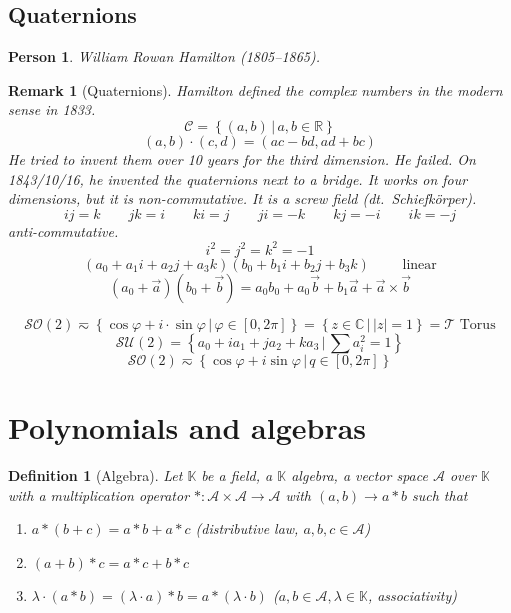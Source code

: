 \documentclass{article}
\newcounter{lecref}[section]
\numberwithin{lecref}{section}
\newtheorem{definition}[lecref]{Definition}
\newtheorem{remark}[lecref]{Remark}
\newtheorem*{person}{Person}
\newcommand{\setdef}[2]{\left\{\left.#1\,\right|\,#2\right\}}
\newcommand{\card}[1]{\left|#1\right|}
\begin{document}
\subsection{Quaternions}

\begin{person}
  William Rowan Hamilton (1805--1865).
\end{person}

\begin{remark}[Quaternions]
  Hamilton defined the complex numbers in the modern sense in 1833.
  \[ \mathcal C = \setdef{(a,b)}{a,b \in \mathbb R} \]
  \[ (a,b) \cdot (c, d) = (ac - bd, ad + bc) \]
  He tried to invent them over 10 years for the third dimension.
  He failed.
  On 1843/10/16, he invented the quaternions next to a bridge.
  It works on four dimensions, but it is non-commutative.
  It is a screw field (dt.~\foreignlanguage{german}{Schiefk\"orper}).
  \[ ij = k \qquad jk = i \qquad ki = j \qquad ji = -k \qquad kj = -i \qquad ik = -j \]
  anti-commutative.
  \[ i^2 = j^2 = k^2 = -1 \]
  \[ (a_0 + a_1 i + a_2 j + a_3 k) (b_0 + b_1 i + b_2 j + b_3 k) \qquad \text{ linear} \]
  \[ (a_0 + \vec a) (b_0 + \vec b) = a_0 b_0 + a_0 \vec b + b_1 \vec a + \vec a \times \vec b \]
\end{remark}

\[ \mathcal{SO}(2) \eqsim \setdef{\cos\varphi + i \cdot \sin\varphi}{\varphi \in [0,2\pi]} = \setdef{z \in \mathbb C}{\card{z} = 1} = \mathcal T \text{ Torus} \]
\[ \mathcal{SU}(2) = \setdef{a_0 + i a_1 + j a_2 + k a_3}{\sum a_i^2 = 1} \]
\[ \mathcal{SO}(2) \eqsim \setdef{\cos \varphi + i \sin\varphi}{q \in [0,2\pi]} \]

\section{Polynomials and algebras} %

\begin{definition}[Algebra] %
  Let $\mathbb K$ be a field, a $\mathbb K$ algebra, a vector space $\mathcal A$ over $\mathbb K$
  with a multiplication operator $*: \mathcal A \times \mathcal A \to \mathcal A$ with $(a,b) \to a * b$ such that
  \begin{enumerate}
    \item $a * (b + c) = a * b + a * c$ (distributive law, $a, b, c \in \mathcal A$)
    \item $(a + b) * c = a * c + b * c$
    \item $\lambda \cdot (a * b) = (\lambda \cdot a) * b = a * (\lambda \cdot b)$ ($a, b \in \mathcal A, \lambda \in \mathbb K$, associativity)
  \end{enumerate}
\end{definition}
\end{document}
